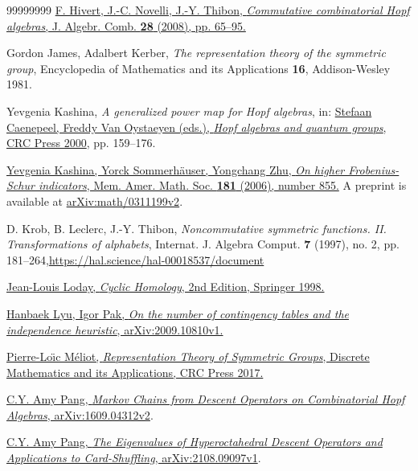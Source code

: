 \documentclass[numbers=enddot,12pt,final,onecolumn,notitlepage]{scrartcl}%
\theoremstyle{definition}
\begin{document}
\begin{thebibliography}{99999999}
%
\href{https://doi.org/10.1007/s10801-007-0077-0}{F. Hivert, J.-C. Novelli,
J.-Y. Thibon, \textit{Commutative combinatorial Hopf algebras}, J. Algebr.
Comb. \textbf{28} (2008), pp. 65--95.}

Gordon James, Adalbert Kerber, \textit{The
representation theory of the symmetric group}, Encyclopedia of Mathematics and
its Applications \textbf{16}, Addison-Wesley 1981.

Yevgenia Kashina, \textit{A generalized power map
for Hopf algebras}, in: \href{https://doi.org/10.1201/9780429187919}{Stefaan
Caenepeel, Freddy Van Oystaeyen (eds.), \textit{Hopf algebras and quantum
groups}, CRC Press 2000}, pp. 159--176.

%
\href{https://bookstore.ams.org/memo-181-855/}{Yevgenia Kashina, Yorck
Sommerh\"{a}user, Yongchang Zhu, \textit{On higher Frobenius-Schur
indicators}, Mem. Amer. Math. Soc. \textbf{181} (2006), number 855.} A
preprint is available at
\href{https://arxiv.org/abs/math/0311199v2}{arXiv:math/0311199v2}.

D. Krob, B. Leclerc, J.-Y. Thibon,
\textit{Noncommutative symmetric functions. II. Transformations of alphabets},
Internat. J. Algebra Comput. \textbf{7} (1997), no. 2, pp. 181--264,\newline\url{https://hal.science/hal-00018537/document}

%
\href{https://doi.org/10.1007/978-3-662-11389-9}{Jean-Louis Loday,
\textit{Cyclic Homology}, 2nd Edition, Springer 1998.}

\href{https://arxiv.org/abs/2009.10810v1}{Hanbaek
Lyu, Igor Pak, \textit{On the number of contingency tables and the
independence heuristic}, arXiv:2009.10810v1.}

%
\href{https://doi.org/10.1201/9781315371016}{Pierre-Lo\"{\i}c M\'{e}liot,
\textit{Representation Theory of Symmetric Groups}, Discrete Mathematics and
its Applications, CRC Press 2017.}

\href{https://arxiv.org/abs/1609.04312v2}{C.Y. Amy
Pang, \textit{Markov Chains from Descent Operators on Combinatorial Hopf
Algebras}, arXiv:1609.04312v2}.

\href{https://arxiv.org/abs/2108.09097v1}{C.Y. Amy
Pang, \textit{The Eigenvalues of Hyperoctahedral Descent Operators and
Applications to Card-Shuffling}, arXiv:2108.09097v1}.


\end{thebibliography}
\end{document}
